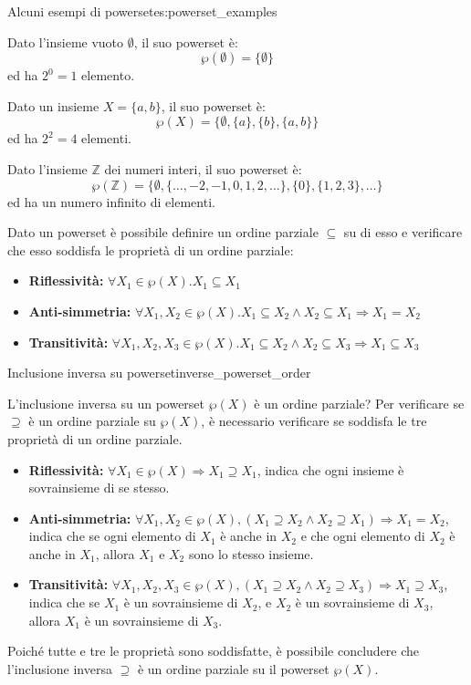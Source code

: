 \begin{esempio}{Alcuni esempi di powerset}{es:powerset_examples}

    Dato l'insieme vuoto $\emptyset$, il suo powerset è:
    \[\wp(\emptyset) = \{\emptyset\}\]
    ed ha $2^0 = 1$ elemento.

    Dato un insieme $X = \{a, b\}$, il suo powerset è:
    \[\wp(X) = \{\emptyset, \{a\}, \{b\}, \{a, b\}\}\]
    ed ha $2^2 = 4$ elementi.

    Dato l'insieme $\mathbb{Z}$ dei numeri interi, il suo powerset è:
    \[\wp(\mathbb{Z}) = \{\emptyset, \{\ldots, -2, -1, 0, 1, 2,
    \ldots\}, \{0\}, \{1, 2, 3\}, \ldots\}\]
    ed ha un numero infinito di elementi.

\end{esempio}

Dato un powerset è possibile definire un ordine parziale $\subseteq$ su di
esso e verificare che esso soddisfa le proprietà di un ordine parziale:

\begin{itemize}
    \item \textbf{Riflessività:} $\forall X_{1}\in \wp(X). X_{1}\subseteq X_{1}$
    \item \textbf{Anti-simmetria:} $\forall X_{1},X_{2}\in\wp(X).X_{1}\subseteq X_{2}\wedge X_{2}\subseteq X_{1}\Rightarrow X_{1}=X_{2}$
    \item \textbf{Transitività:} $\forall X_{1},X_{2},X_{3}\in\wp(X).X_{1}\subseteq X_{2}\wedge X_{2}\subseteq X_{3}\Rightarrow X_{1}\subseteq X_{3}$
\end{itemize}


\begin{esercizio}{Inclusione inversa su powerset}{inverse_powerset_order}

L'inclusione inversa su un powerset $\wp(X)$ è un ordine parziale?
Per verificare se $\supseteq$ è un ordine parziale su $\wp(X)$,
è necessario verificare se soddisfa le tre proprietà di un ordine parziale.

\begin{itemize}
    \item \textbf{Riflessività:} $\forall X_1 \in \wp(X) \Rightarrow
    X_1 \supseteq X_1$, indica che ogni insieme è sovrainsieme di se stesso.
    \item \textbf{Anti-simmetria:} $\forall X_1, X_2 \in \wp(X),
    (X_1 \supseteq X_2 \wedge X_2 \supseteq X_1) \Rightarrow X_1 = X_2$,
    indica che se ogni elemento di $X_1$ è anche in $X_2$ e che ogni elemento di
    $X_2$ è anche in $X_1$, allora $X_1$ e $X_2$ sono lo stesso insieme.
    \item \textbf{Transitività:} $\forall X_1, X_2, X_3 \in \wp(X),
    (X_1 \supseteq X_2 \wedge X_2 \supseteq X_3) \Rightarrow X_1 \supseteq X_3$,
    indica che se $X_1$ è un sovrainsieme di $X_2$, e $X_2$ è un sovrainsieme di
    $X_3$, allora $X_1$ è un sovrainsieme di $X_3$.
\end{itemize}

Poiché tutte e tre le proprietà sono soddisfatte, è possibile concludere che
l'inclusione inversa $\supseteq$ è un ordine parziale su il powerset
$\wp(X)$.

\end{esercizio}

